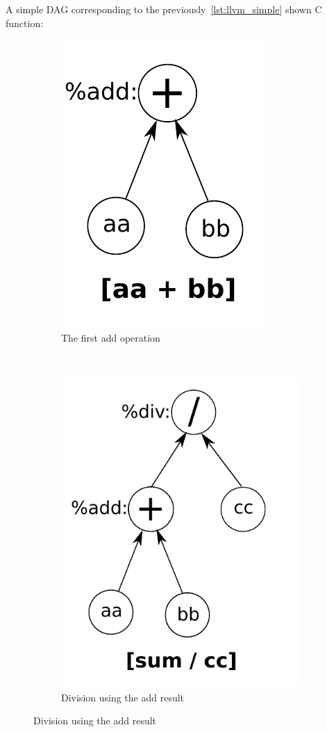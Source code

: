 A simple DAG corresponding to the previously~\ref{lst:llvm_simple} shown C function:
\begin{figure}
    \centering
    \begin{subfigure}[b]{0.45\textwidth}
        \includegraphics[width=.5\textwidth]{../slides/pictures/dag_step_1}
        \caption{The first add operation}
        \label{fig:dag_fmadd}
    \end{subfigure}
    ~ %
    \begin{subfigure}[b]{0.45\textwidth}
        \includegraphics[width=.65\textwidth]{../slides/pictures/dag_step_2}
        \caption{Division using the add result}
    \end{subfigure}
\end{figure}


